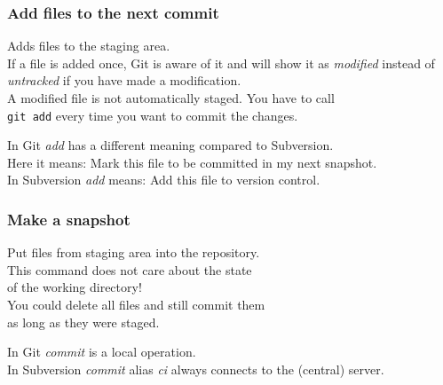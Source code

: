\documentclass{gittalk}
\newcommand{\hlcommand}[1]{ %
\colorbox{base3}{\small \texttt{#1}}
}
\begin{document}
\begin{frame}
\frametitle{Add files to the next commit}
\begin{tcolorbox}[title=git add]
Adds files to the staging area.\\[0.5em]
If a file is added once, Git is aware of it and will show it as \emph{modified}
instead of \emph{untracked} if you have made a modification.\\[0.5em]
A modified file is not automatically staged. You have to call\\
\hlcommand{git add} every time you want to commit the changes.
\end{tcolorbox}
\vspace*{0.5em}
In Git \emph{add} has a different meaning compared to Subversion.\\[0.5em]
Here it means: Mark this file to be committed in my next snapshot.\\[0.5em]
In Subversion \emph{add} means: Add this file to version control.
\end{frame}

\begin{frame}
\frametitle{Make a snapshot}
\begin{tcolorbox}[title=git commit]
Put files from staging area into the repository.\\[0.5em]
This command does not care about the state\\
of the working directory!\\[0.5em]
You could delete all files and still commit them\\
as long as they were staged.
\end{tcolorbox}
\vspace*{0.5em}
In Git \emph{commit} is a local operation.\\[0.5em]
In Subversion \emph{commit} alias \emph{ci} always connects to the (central) server.
\end{frame}
\end{document}
